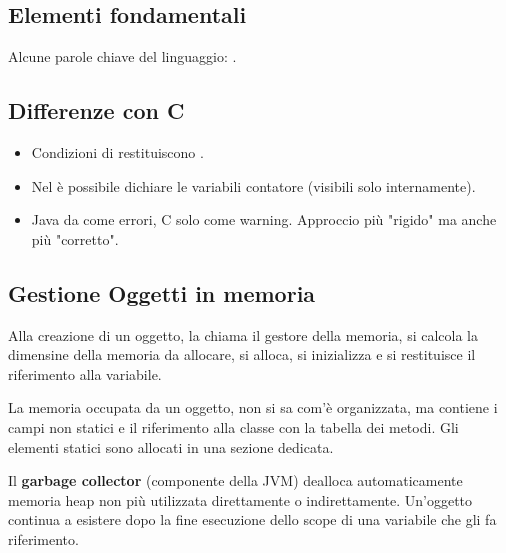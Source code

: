 \subsection{Elementi fondamentali}

Alcune parole chiave del linguaggio: .

\subsection{Differenze con C}
\begin{itemize}
	\item Condizioni di  restituiscono .

	\item Nel  è possibile dichiare le variabili contatore (visibili solo internamente).


	\item Java da  come errori, C solo come warning. Approccio più "rigido" ma anche più "corretto".
\end{itemize}

\subsection{Gestione Oggetti in memoria}
Alla creazione di un oggetto, la  chiama il gestore della memoria, si calcola la dimensine della memoria da allocare, si alloca, si inizializza e si restituisce il riferimento alla variabile.

La memoria occupata da un oggetto, non si sa com'è organizzata, ma contiene i campi non statici e il riferimento alla classe con la tabella dei metodi. Gli elementi statici sono allocati in una sezione dedicata.

Il \textbf{garbage collector} (componente della JVM) dealloca automaticamente memoria heap non più utilizzata direttamente o indirettamente. Un'oggetto continua a esistere dopo la fine esecuzione dello scope di una variabile che gli fa riferimento.
